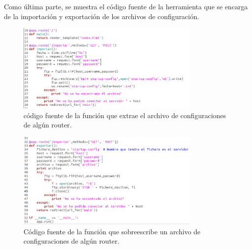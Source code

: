Como última parte, se muestra el código fuente de la herramienta que se encarga de la importación y exportación de los archivos de configuración.

\pagebreak
\begin{figure}[htbp!]
	\centering
		\includegraphics[width=0.8\textwidth]{desarrollo/tarea3/imagenes/imagen11.png}
	\caption{código fuente de la función que extrae el archivo de configuraciones de algún router.}
\end{figure}

\begin{figure}[htbp!]
	\centering
		\includegraphics[width=0.8\textwidth]{desarrollo/tarea3/imagenes/imagen12.png}
	\caption{Código fuente de la función que sobreescribe un archivo de configuraciones de algún router.}
\end{figure}































